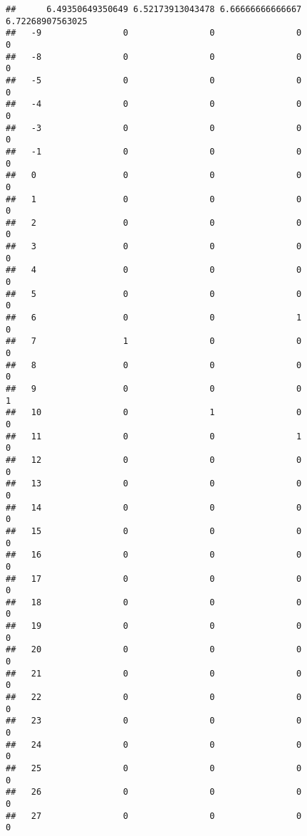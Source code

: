\documentclass[]{article}
\begin{document}
\begin{verbatim}
##      6.49350649350649 6.52173913043478 6.66666666666667 6.72268907563025
##   -9                0                0                0                0
##   -8                0                0                0                0
##   -5                0                0                0                0
##   -4                0                0                0                0
##   -3                0                0                0                0
##   -1                0                0                0                0
##   0                 0                0                0                0
##   1                 0                0                0                0
##   2                 0                0                0                0
##   3                 0                0                0                0
##   4                 0                0                0                0
##   5                 0                0                0                0
##   6                 0                0                1                0
##   7                 1                0                0                0
##   8                 0                0                0                0
##   9                 0                0                0                1
##   10                0                1                0                0
##   11                0                0                1                0
##   12                0                0                0                0
##   13                0                0                0                0
##   14                0                0                0                0
##   15                0                0                0                0
##   16                0                0                0                0
##   17                0                0                0                0
##   18                0                0                0                0
##   19                0                0                0                0
##   20                0                0                0                0
##   21                0                0                0                0
##   22                0                0                0                0
##   23                0                0                0                0
##   24                0                0                0                0
##   25                0                0                0                0
##   26                0                0                0                0
##   27                0                0                0                0

\end{verbatim}
\end{document}
